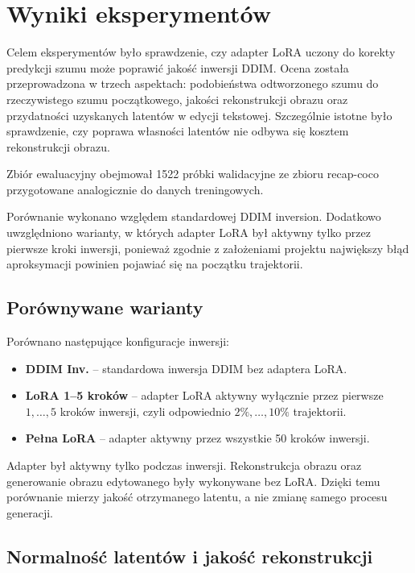 \documentclass[
    left=2.5cm,
    right=2.5cm,
    top=2.5cm,
    bottom=3cm,
    bindingoffset=6mm,
    nohyphenation=false
]{szablon/eiti/sprawozdanie}
\begin{document}
\section{Wyniki eksperymentów}

Celem eksperymentów było sprawdzenie, czy adapter LoRA uczony do korekty
predykcji szumu może poprawić jakość inwersji DDIM. Ocena została
przeprowadzona w trzech aspektach: podobieństwa odtworzonego szumu do
rzeczywistego szumu początkowego, jakości rekonstrukcji obrazu oraz
przydatności uzyskanych latentów w edycji tekstowej. Szczególnie istotne
było sprawdzenie, czy poprawa własności latentów nie odbywa się kosztem
rekonstrukcji obrazu.

Zbiór ewaluacyjny obejmował 1522 próbki walidacyjne ze zbioru recap-coco przygotowane analogicznie
do danych treningowych.

Porównanie wykonano względem standardowej DDIM inversion. Dodatkowo
uwzględniono warianty, w których adapter LoRA był aktywny tylko przez
pierwsze kroki inwersji, ponieważ zgodnie z założeniami projektu największy
błąd aproksymacji powinien pojawiać się na początku trajektorii.

\subsection{Porównywane warianty}

Porównano następujące konfiguracje inwersji:
\begin{itemize}
    \item \textbf{DDIM Inv.} -- standardowa inwersja DDIM bez adaptera LoRA.
    \item \textbf{LoRA 1--5 kroków} -- adapter LoRA aktywny wyłącznie przez
          pierwsze $1,\ldots,5$ kroków inwersji, czyli odpowiednio
          $2\%,\ldots,10\%$ trajektorii.
    \item \textbf{Pełna LoRA} -- adapter aktywny przez wszystkie 50 kroków
          inwersji.
\end{itemize}

Adapter był aktywny tylko podczas inwersji. Rekonstrukcja obrazu oraz
generowanie obrazu edytowanego były wykonywane bez LoRA. Dzięki temu
porównanie mierzy jakość otrzymanego latentu, a nie zmianę samego procesu
generacji.


\subsection{Normalność latentów i jakość rekonstrukcji}
\end{document}
